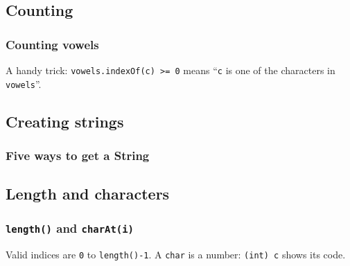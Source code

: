 \documentclass[aspectratio=169,10pt,compress]{beamer}
\begin{document}
\subsection[Count]{Counting}




\begin{frame}[t,fragile] \frametitle{Counting vowels}

  \vspace{0.3em}
  \small A handy trick: \texttt{vowels.indexOf(c) >= 0} means ``\texttt{c} is one of the characters in \texttt{vowels}''.
\end{frame}





\subsection[Create]{Creating strings}




\begin{frame}[t,fragile] \frametitle{Five ways to get a String}
\end{frame}



\subsection[Length]{Length and characters}




\begin{frame}[t,fragile] \frametitle{\texttt{length()} and \texttt{charAt(i)}}

  \vspace{0.3em}
  \small Valid indices are \texttt{0} to \texttt{length()-1}. A \texttt{char} is a number: \texttt{(int) c} shows its code.
\end{frame}
\end{document}
